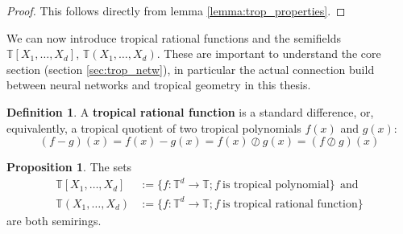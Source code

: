 \documentclass{article}
\theoremstyle{definition}
\newtheorem{definition}[theorem]{Definition}
\newtheorem{proposition}[theorem]{Proposition}
\begin{document}
\begin{proof}
This follows directly from lemma \ref{lemma:trop_properties}.
\end{proof}

We can now introduce tropical rational functions and the semifields $\mathbb{T}[X_{1} , \dots , X_{d}]$, $\mathbb{T}(X_{1} , \dots , X_{d})$. These are important to understand the core section (section \ref{sec:trop_netw}), in particular the actual connection build between neural networks and tropical geometry in this thesis.

\begin{definition}\hspace{1sp}\cite[p.~3]{zhang2018tropical}
A \textbf{tropical rational function} is a standard difference, or, equivalently, a tropical quotient of two tropical polynomials $f(x)$ and $g(x)$:
$$ (f-g)(x) = f(x) - g(x) = f(x) \oslash g(x) = (f \oslash g)(x)$$
\end{definition}
\begin{proposition}\hspace{1sp}\cite[p.~3]{zhang2018tropical}\label{prop:trop_semi_ring_set}
The sets 
\begin{align*}
\mathbb{T}[X_1, \dots , X_d] &:= \{ f: \mathbb{T}^{d} \to \mathbb{T} ; f \ \text{is tropical polynomial} \} \ \ \text{and} \\ 
\mathbb{T}(X_1, \dots , X_d) &:= \{ f: \mathbb{T}^{d} \to \mathbb{T} ; f \ \text{is tropical rational function} \}
\end{align*}
 are both semirings.
\end{proposition}
\end{document}
